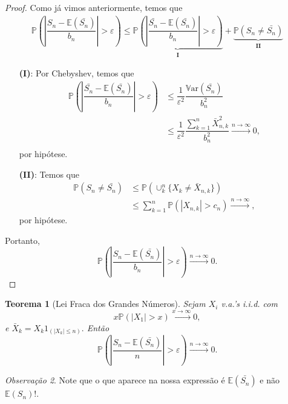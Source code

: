 \documentclass[12pt,a4paper,oneside]{book}
\newtheorem{theorem}{Teorema}[section]
\theoremstyle{definition}
\theoremstyle{remark}
\newtheorem{remark}[theorem]{Observa\c{c}\~ao}
\numberwithin{equation}{section}
\newcommand{\e}{\varepsilon}
\newcommand{\E}{\mathbb{E}}
\newcommand{\pr}{\mathbb{P}}
\newcommand{\Var}{\mathbb{V}\text{ar}}
\begin{document}
\begin{proof} Como já vimos anteriormente, temos que
\begin{align*}
\pr\left(\left|\dfrac{S_n-\E(\bar{S_n})}{b_n}\right|>\e \right) \leq \underbrace{\pr\left(   \left|\dfrac{\bar{S_n}-\E(\bar{S_n})}{b_n}\right|>\e  \right)}_{\textbf{I}} + \underbrace{\pr(S_n \neq \bar{S_n}) }_{\textbf{II}}
\end{align*}
\begin{itemize}
\item[\textbf{(I)}:] Por Chebyshev, temos que
\begin{align*}
\pr\left(   \left|\dfrac{\bar{S_n}-\E(\bar{S_n})}{b_n}\right|>\e  \right)&\leq \dfrac{1}{\e^2}\dfrac{\Var(\bar{S_n})}{b_n^2}\\
&\leq \dfrac{1}{\e^2}\dfrac{\sum_{k=1}^n  \bar{X}^2_{n,k}}{b_n^2} \xrightarrow{n\rightarrow\infty}0,\\
\end{align*}
por hipótese.

\item[\textbf{(II)}:] Temos que
\begin{align*}
\pr(S_n \neq \bar{S_n})&\leq \pr(\cup_k^n \{X_k\neq \bar{X}_{n,k}\})\\
&\leq \sum_{k=1}^n \pr(|X_{n,k}|>c_n)\xrightarrow{n\rightarrow \infty},
\end{align*}
por hipótese.

\end{itemize}
Portanto, 
$$\pr\left(\left|\dfrac{S_n-\E(\bar{S_n})}{b_n}\right|>\e \right) \xrightarrow{n\rightarrow \infty}0.$$


\end{proof}


\begin{theorem}[Lei Fraca dos Grandes Números]\label{leifraca xpx} Sejam $X_i$ v.a.'s i.i.d. com 
$$x\pr(|X_1|>x) \xrightarrow{x\rightarrow \infty} 0 ,$$
e $\bar{X}_{k} = X_{k}1_{(|X_{k}|\leq n)}.$
Então
$$\pr\left(\left|\dfrac{S_n-\E(\bar{S_n})}{n}\right|>\e \right) \xrightarrow{n\rightarrow \infty}0.$$
\end{theorem}

\begin{tcolorbox}[colback = yellow!60]
\begin{remark}
Note que o que aparece na nossa expressão é $\E(\bar{S_n})$ e não $\E(S_n)$!.
\end{remark}
\end{tcolorbox}
\end{document}
